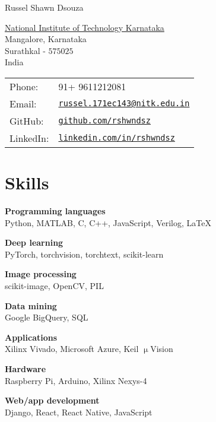 \documentclass[letterpaper]{article}
\def\name{Russel Shawn Dsouza}
\renewenvironment{itemize}{
  \begin{list}{}{
    \setlength{\leftmargin}{1.5em}
  }
}{
  \end{list}
}
\begin{document}
{\huge \name}


\vspace{0.25in}

\begin{minipage}{0.45\linewidth}
  \href{http://www.nitk.ac.in/}{National Institute of Technology Karnataka} \\
  Mangalore, Karnataka \\
  Surathkal - $575025$\\
  India
\end{minipage}
\hfill
\begin{minipage}{0.45\linewidth}
  \begin{tabular}{ll}
    Phone: & 91+ 9611212081 \\
    Email: & \href{mailto:russel.171ec143@nitk.edu.in}{\tt russel.171ec143@nitk.edu.in} \\
    GitHub: & \href{https://www.github.com/rshwndsz}{\tt github.com/rshwndsz} \\
    LinkedIn: & \href{https://www.linkedin.com/in/rshwndsz}{\tt linkedin.com/in/rshwndsz}
  \end{tabular}
\end{minipage}

\section*{Skills}
  \begin{itemize}
    \item \textbf{Programming languages}\\
    Python, MATLAB, C, C++, JavaScript, Verilog, \LaTeX
    \item \textbf{Deep learning}\\
    PyTorch, torchvision, torchtext, scikit-learn
    \item \textbf{Image processing}\\
    scikit-image, OpenCV, PIL
    \item \textbf{Data mining}\\
    Google BigQuery, SQL
    \item \textbf{Applications}\\
    Xilinx Vivado, Microsoft Azure, Keil $\upmu$Vision
    \item \textbf{Hardware}\\
    Raspberry Pi, Arduino, Xilinx Nexys-4
    \item \textbf{Web/app development}\\
    Django, React, React Native, JavaScript
  \end{itemize}
\end{document}
